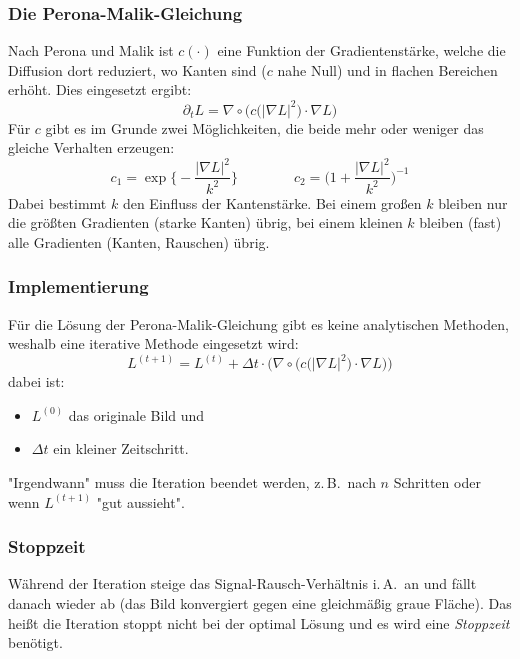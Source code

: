 \documentclass[a4paper, 11pt, accentcolor = tud3b]{tudreport}
\newcommand{\zB}{z.\,B.~}
\newcommand{\iA}{i.\,A.~}
\begin{document}
				\subsubsection{Die Perona-Malik-Gleichung}
					Nach Perona und Malik ist \( c(\cdot) \) eine Funktion der Gradientenstärke, welche die Diffusion dort reduziert, wo Kanten sind (\(c\) nahe Null) und in flachen Bereichen erhöht. Dies eingesetzt ergibt:
					\begin{equation*}
						\partial_t L = \nabla \circ \Big( c\big( \lvert \nabla L \rvert^2 \big) \cdot \nabla L \Big)
					\end{equation*}
					Für \(c\) gibt es im Grunde zwei Möglichkeiten, die beide mehr oder weniger das gleiche Verhalten erzeugen:
					\begin{equation*}
						c_1 = \exp \Bigg\{ -\frac{\lvert \nabla L \rvert^2}{k^2} \Bigg\} \quad\quad\quad\quad c_2 = \Bigg( 1 + \frac{\lvert \nabla L \rvert^2}{k^2} \Bigg)^{-1}
					\end{equation*}
					Dabei bestimmt \(k\) den Einfluss der Kantenstärke. Bei einem großen \(k\) bleiben nur die größten Gradienten (starke Kanten) übrig, bei einem kleinen \(k\) bleiben (fast) alle Gradienten (Kanten, Rauschen) übrig.

				\subsubsection{Implementierung}
					Für die Lösung der Perona-Malik-Gleichung gibt es keine analytischen Methoden, weshalb eine iterative Methode eingesetzt wird:
					\begin{equation*}
						L^{(t + 1)} = L^{(t)} + \Delta t \cdot \bigg( \nabla \circ \Big( c\big(\lvert \nabla L \rvert^2\big) \cdot \nabla L \Big) \bigg)
					\end{equation*}
					dabei ist:
					\begin{itemize}
						\item \( L^{(0)} \) das originale Bild und
						\item \( \Delta t \) ein kleiner Zeitschritt.
					\end{itemize}
					"Irgendwann" muss die Iteration beendet werden, \zB nach \(n\) Schritten oder wenn \( L^{(t + 1)} \) "gut aussieht".

				\subsubsection{Stoppzeit}
					Während der Iteration steige das Signal-Rausch-Verhältnis \iA an und fällt danach wieder ab (das Bild konvergiert gegen eine gleichmäßig graue Fläche). Das heißt die Iteration stoppt nicht bei der optimal Lösung und es wird eine \emph{Stoppzeit} benötigt.
\end{document}

